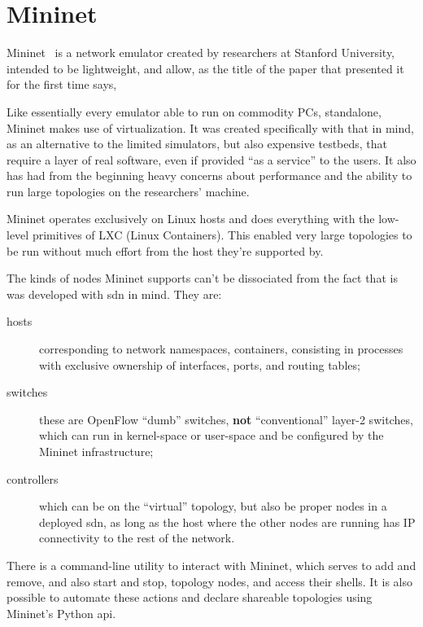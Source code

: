 \section{Mininet}
\label{sec:exemulmininet}

Mininet~\cite{mininetnetworklaptop} is a network emulator created by researchers at Stanford University, intended to be lightweight, and allow, as the title of the paper that presented it for the first time says, 

Like essentially every emulator able to run on commodity PCs, standalone, Mininet makes use of virtualization.
It was created specifically with that in mind, as an alternative to the limited simulators, but also expensive testbeds, that require a layer of real software, even if provided ``as a service'' to the users.
It also has had from the beginning heavy concerns about performance and the ability to run large topologies on the researchers' machine.

Mininet operates exclusively on Linux hosts and does everything with the low-level primitives of LXC (Linux Containers).
This enabled very large topologies to be run without much effort from the host they're supported by.

The kinds of nodes Mininet supports can't be dissociated from the fact that is was developed with \gls{sdn} in mind.
They are:
\begin{description}
	\item[hosts] corresponding to network namespaces, containers, consisting in processes with exclusive ownership of interfaces, ports, and routing tables;
	\item[switches] these are OpenFlow ``dumb'' switches, \textbf{not} ``conventional'' layer-2 switches, which can run in kernel-space or user-space and be configured by the Mininet infrastructure;
	\item[controllers] which can be on the ``virtual'' topology, but also be proper nodes in a deployed \gls{sdn}, as long as the host where the other nodes are running has IP connectivity to the rest of the network.
\end{description}

There is a command-line utility to interact with Mininet, which serves to add and remove, and also start and stop, topology nodes, and access their shells.
It is also possible to automate these actions and declare shareable topologies using Mininet's Python \gls{api}.

